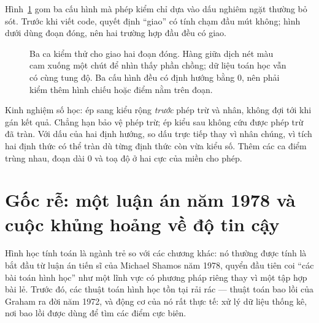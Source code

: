 \documentclass[../../algorithm.tex]{subfiles}
\begin{document}
Hình~\ref{fig:review-degenerate} gom ba cấu hình mà phép kiểm chỉ dựa vào dấu nghiêm ngặt thường bỏ sót.
Trước khi viết code, quyết định ``giao'' có tính chạm đầu mút không; hình dưới dùng đoạn đóng, nên hai trường hợp đầu đều có giao.

\begin{figure}[H]\centering
{}
\caption{Ba ca kiểm thử cho giao hai đoạn đóng. Hàng giữa dịch nét màu cam xuống một chút để nhìn thấy phần chồng; dữ liệu toán học vẫn có cùng tung độ. Ba cấu hình đều có định hướng bằng 0, nên phải kiểm thêm hình chiếu hoặc điểm nằm trên đoạn.}
\label{fig:review-degenerate}
\end{figure}

Kinh nghiệm số học: ép sang kiểu rộng \emph{trước} phép trừ và nhân, không đợi tới khi gán kết quả.
Chẳng hạn  bảo vệ phép trừ; ép kiểu sau  không cứu được phép trừ đã tràn.
Với dấu của hai định hướng, so dấu trực tiếp thay vì nhân chúng, vì tích hai định thức có thể tràn dù từng định thức còn vừa kiểu số.
Thêm các ca điểm trùng nhau, đoạn dài 0 và toạ độ ở hai cực của miền cho phép.

\section{Gốc rễ: một luận án năm 1978 và cuộc khủng hoảng về độ tin cậy}

Hình học tính toán là ngành trẻ so với các chương khác: nó thường được tính là bắt đầu từ luận án tiến sĩ của Michael Shamos năm 1978, quyển đầu tiên coi ``các bài toán hình học'' như một lĩnh vực có phương pháp riêng thay vì một tập hợp bài lẻ. Trước đó, các thuật toán hình học tồn tại rải rác --- thuật toán bao lồi của Graham ra đời năm 1972, và động cơ của nó rất thực tế: xử lý dữ liệu thống kê, nơi bao lồi được dùng để tìm các điểm cực biên.
\end{document}
